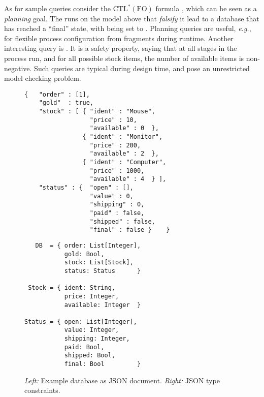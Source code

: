 \documentclass{llncs}
\newcommand{\eg}{\textit{e.g.}}
\newcommand{\CTLsFO}{\ensuremath{\text{CTL}^\ast(\text{FO})}\xspace}
\begin{document}
As for sample queries consider the \CTLsFO formula
, which can be seen as a \emph{planning} goal.
The runs on the model above that \emph{falsify} it lead to a database  that has reached a ``final'' state, with  being set to .
Planning queries are useful, \eg, for flexible
process configuration from fragments during runtime. Another interesting query is
.
It is a safety property, saying that at all stages in the process run, and for all possible stock items, the number of available items is non-negative.
Such queries are typical during design time, and pose an unrestricted model checking problem.



\begin{figure}[tbp]
\begin{minipage}[t]{0.5\linewidth}
\begingroup
\fontsize{7pt}{9pt}\selectfont
\begin{verbatim}
{   "order" : [1],
    "gold"  : true,
    "stock" : [ { "ident" : "Mouse",
                  "price" : 10,
                  "available" : 0  },
                { "ident" : "Monitor",
                  "price" : 200,
                  "available" : 2  },
                { "ident" : "Computer",
                  "price" : 1000,
                  "available" : 4  } ],
    "status" : {  "open" : [],
                  "value" : 0,
                  "shipping" : 0,
                  "paid" : false,
                  "shipped" : false,
                  "final" : false }    }
\end{verbatim}
\endgroup
\end{minipage}
\begin{minipage}[t]{0.5\linewidth}
\begingroup
\fontsize{7pt}{9pt}\selectfont
\begin{verbatim}
   DB  = { order: List[Integer],
           gold: Bool,
           stock: List[Stock],
           status: Status      }

 Stock = { ident: String,
           price: Integer,
           available: Integer  }

Status = { open: List[Integer],
           value: Integer,
           shipping: Integer,
           paid: Bool,
           shipped: Bool,
           final: Bool         }
\end{verbatim}
\endgroup
\end{minipage}
\caption{\emph{Left:} Example database as JSON document. \emph{Right:} JSON type constraints.}
\label{fig:data}
\end{figure}
\end{document}
